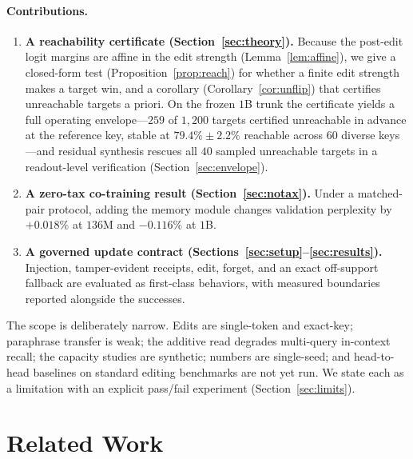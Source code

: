 \documentclass[10pt,twocolumn]{article}
\theoremstyle{remark}
\begin{document}
\paragraph{Contributions.}
\begin{enumerate}
  \item \textbf{A reachability certificate (Section~\ref{sec:theory}).} Because
  the post-edit logit margins are affine in the edit strength
  (Lemma~\ref{lem:affine}), we give a closed-form test
  (Proposition~\ref{prop:reach}) for whether a finite edit strength makes a
  target win, and a corollary (Corollary~\ref{cor:unflip}) that certifies
  unreachable targets a priori. On the frozen $1$B trunk the certificate yields
  a full operating envelope---$259$ of $1{,}200$ targets certified unreachable in
  advance at the reference key, stable at $79.4\%\pm2.2\%$ reachable across $60$
  diverse keys---and residual synthesis rescues all $40$ sampled unreachable
  targets in a readout-level verification (Section~\ref{sec:envelope}).
  \item \textbf{A zero-tax co-training result (Section~\ref{sec:notax}).} Under a
  matched-pair protocol, adding the memory module changes validation perplexity by
  $+0.018\%$ at $136$M and $-0.116\%$ at $1$B.
  \item \textbf{A governed update contract (Sections~\ref{sec:setup}--\ref{sec:results}).}
  Injection, tamper-evident receipts, edit, forget, and an exact off-support
  fallback are evaluated as first-class behaviors, with measured boundaries
  reported alongside the successes.
\end{enumerate}

The scope is deliberately narrow. Edits are single-token and
exact-key; paraphrase transfer is weak; the additive read degrades multi-query
in-context recall; the capacity studies are synthetic; numbers are single-seed;
and head-to-head baselines on standard editing benchmarks are not yet run. We
state each as a limitation with an explicit pass/fail experiment
(Section~\ref{sec:limits}).

\section{Related Work}
\label{sec:related}
\end{document}
